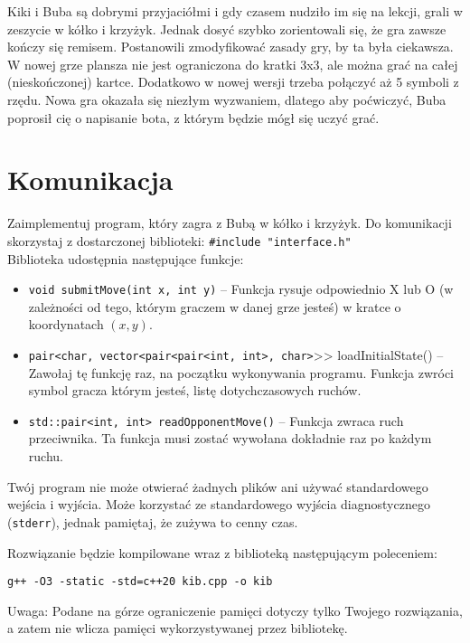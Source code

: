 \documentclass{spiral}
\begin{document}
\makeheader

Kiki i Buba są dobrymi przyjaciółmi i gdy czasem nudziło im się na lekcji, grali w zeszycie w kółko i krzyżyk.
Jednak dosyć szybko zorientowali się, że gra zawsze kończy się remisem.
Postanowili zmodyfikować zasady gry, by ta była ciekawsza. W nowej grze plansza nie jest ograniczona do kratki 3x3,
ale można grać na całej (nieskończonej) kartce. Dodatkowo w nowej wersji trzeba połączyć aż 5 symboli z rzędu.
Nowa gra okazała się niezłym wyzwaniem, dlatego aby poćwiczyć, Buba poprosił cię o napisanie bota, z którym będzie mógł się uczyć grać.

\section{Komunikacja}

\noindent Zaimplementuj program, który zagra z Bubą w kółko i krzyżyk. Do komunikacji skorzystaj z dostarczonej biblioteki:
\texttt{\#include "interface.h"} \\

\noindent Biblioteka udostępnia następujące funkcje:
\begin{itemize}
	\item \texttt{void submitMove(int x, int y)} – Funkcja rysuje odpowiednio X lub O (w zależności od tego, którym graczem w danej grze jesteś) w kratce o koordynatach $(x, y)$.

	\item \texttt{pair<char, vector<pair<pair<int, int>, char>}{>}{> loadInitialState()} – Zawołaj tę funkcję raz, na początku wykonywania programu. Funkcja zwróci symbol gracza którym jesteś, listę dotychczasowych ruchów.

	\item \texttt{std::pair<int, int> readOpponentMove()} – Funkcja zwraca ruch przeciwnika. Ta funkcja musi zostać wywołana dokładnie raz po każdym ruchu.
\end{itemize}

\noindent Twój program nie może otwierać żadnych plików ani używać standardowego wejścia i wyjścia.
Może korzystać ze standardowego wyjścia diagnostycznego (\texttt{stderr}), jednak pamiętaj, że zużywa to cenny czas.

\noindent Rozwiązanie będzie kompilowane wraz z biblioteką następującym poleceniem:
\begin{verbatim}
g++ -O3 -static -std=c++20 kib.cpp -o kib
\end{verbatim}

\noindent Uwaga: Podane na górze ograniczenie pamięci dotyczy tylko Twojego rozwiązania, a zatem nie wlicza pamięci wykorzystywanej przez bibliotekę.
\end{document}
